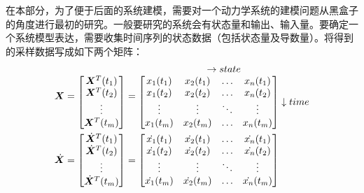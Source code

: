 在本部分，为了便于后面的系统建模，需要对一个动力学系统的建模问题从黑盒子的角度进行最初的研究。一般要研究的系统会有状态量和输出、输入量。要确定一个系统模型表达，需要收集时间序列的状态数据（包括状态量及导数量）。将得到的采样数据写成如下两个矩阵\cite{brunton2016discovering}：
\begin{equation}
\label{eq:chap3:1}
\begin{aligned}
\bm{X} &= \begin{matrix}
\\
\begin{bmatrix}
 \small \bm{X}^T(t_1)     \\
 \small \bm{X}^T(t_2)     \\
 \small \vdots            \\
 \small \bm{X}^T(t_{m})   \\
\end{bmatrix}
 \end{matrix}
= \begin{matrix}
  \rightarrow {state}  \\
  \begin{bmatrix}
   x_1(t_1) & x_2(t_1) & \ldots & x_n(t_1) \\
   x_1(t_2) & x_2(t_2) & \ldots & x_n(t_2) \\
   \vdots   & \vdots   & \ddots & \vdots   \\
   x_1(t_m) & x_2(t_m) & \ldots & x_n(t_m) \\
  \end{bmatrix}
  \downarrow time \\
 \end{matrix}
\\
\dot {\bm{X}} &=
\begin{bmatrix}
 \small \dot {\bm{X}}^T (t_1)     \\
 \small \dot {\bm{X}}^T(t_2)      \\
 \small \vdots                 \\
 \small \dot {\bm{X}}^T(t_{m}) \\
\end{bmatrix}
= \begin{bmatrix}
   \dot{x_1}(t_1)  &  \dot{x_2}(t_1) & \ldots & \dot{x_n}(t_1) \\
   \dot{x_1}(t_2)  &  \dot{x_2}(t_2) & \ldots & \dot{x_n}(t_2) \\
   \vdots          &  \vdots         & \ddots & \vdots         \\
   \dot{x_1}(t_m)  &  \dot{x_2}(t_m) & \ldots & \dot{x_n}(t_m) \\
  \end{bmatrix}
\end{aligned}
\end{equation}

